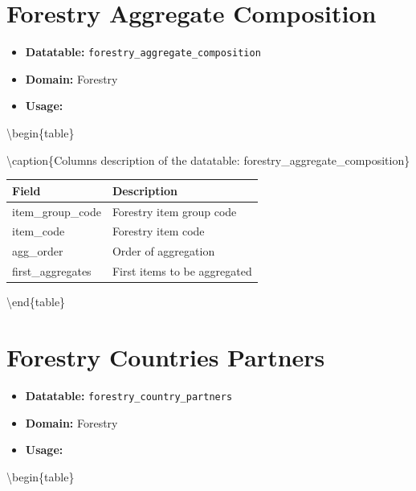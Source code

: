 \documentclass[
]{book}
\providecommand{\tightlist}{%
  \setlength{\itemsep}{0pt}\setlength{\parskip}{0pt}}
\begin{document}
\hypertarget{forestry-aggregate-composition}{%
\section*{Forestry Aggregate Composition}\label{forestry-aggregate-composition}}

\begin{itemize}
\tightlist
\item
  \textbf{Datatable:} \texttt{forestry\_aggregate\_composition}
\item
  \textbf{Domain:} Forestry
\item
  \textbf{Usage:}
\end{itemize}

\textbackslash begin\{table\}

\textbackslash caption\{\label{tab:forestryaggregatecomposition}Columns description of the datatable: forestry\_aggregate\_composition\}
\centering
\fontsize{14}{16}\selectfont

\begin{tabular}[t]{l|l}
\hline
\rowcolor[HTML]{a9c9a7}  Field & Description\\
\hline
item\_group\_code & Forestry item group code\\
\hline
item\_code & Forestry item code\\
\hline
agg\_order & Order of aggregation\\
\hline
first\_aggregates & First items to be aggregated\\
\hline
\end{tabular}

\textbackslash end\{table\}

\hypertarget{forestry-countries-partners}{%
\section*{Forestry Countries Partners}\label{forestry-countries-partners}}

\begin{itemize}
\tightlist
\item
  \textbf{Datatable:} \texttt{forestry\_country\_partners}
\item
  \textbf{Domain:} Forestry
\item
  \textbf{Usage:}
\end{itemize}

\textbackslash begin\{table\}
\end{document}
